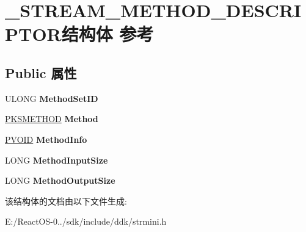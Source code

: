 \hypertarget{struct___s_t_r_e_a_m___m_e_t_h_o_d___d_e_s_c_r_i_p_t_o_r}{}\section{\+\_\+\+S\+T\+R\+E\+A\+M\+\_\+\+M\+E\+T\+H\+O\+D\+\_\+\+D\+E\+S\+C\+R\+I\+P\+T\+O\+R结构体 参考}
\label{struct___s_t_r_e_a_m___m_e_t_h_o_d___d_e_s_c_r_i_p_t_o_r}
\subsection*{Public 属性}
\begin{DoxyCompactItemize}
\item 
\mbox{\label{struct___s_t_r_e_a_m___m_e_t_h_o_d___d_e_s_c_r_i_p_t_o_r_a7aed4244b9f45b17109a20184f557c4a}} 
U\+L\+O\+NG {\bfseries Method\+Set\+ID}
\item 
\mbox{\label{struct___s_t_r_e_a_m___m_e_t_h_o_d___d_e_s_c_r_i_p_t_o_r_a24701fed8f5faad0240070c24b89c159}} 
\hyperlink{struct_k_s_i_d_e_n_t_i_f_i_e_r}{P\+K\+S\+M\+E\+T\+H\+OD} {\bfseries Method}
\item 
\mbox{\label{struct___s_t_r_e_a_m___m_e_t_h_o_d___d_e_s_c_r_i_p_t_o_r_a3af1b4532d3a09c14fe805c926949ff3}} 
\hyperlink{interfacevoid}{P\+V\+O\+ID} {\bfseries Method\+Info}
\item 
\mbox{\label{struct___s_t_r_e_a_m___m_e_t_h_o_d___d_e_s_c_r_i_p_t_o_r_a1c59b4bf8ffacc3ce595689f4d6e3903}} 
L\+O\+NG {\bfseries Method\+Input\+Size}
\item 
\mbox{\label{struct___s_t_r_e_a_m___m_e_t_h_o_d___d_e_s_c_r_i_p_t_o_r_a28f3d9fe80a2ec0348d56c8c51708d47}} 
L\+O\+NG {\bfseries Method\+Output\+Size}
\end{DoxyCompactItemize}


该结构体的文档由以下文件生成\+:\begin{DoxyCompactItemize}
\item 
E\+:/\+React\+O\+S-\/0../sdk/include/ddk/strmini.\+h\end{DoxyCompactItemize}
